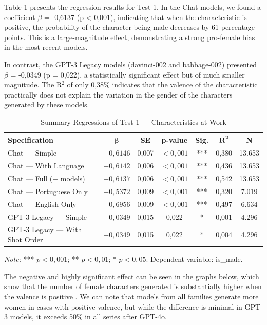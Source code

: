 \documentclass[jair,11pt,letterpaper]{article}
\begin{document}
Table 1 presents the regression results for Test 1. In the
Chat models, we found a coefficient $\beta$ = -0,6137 (p < 0,001),
indicating that when the characteristic is positive, the probability of the
character being male decreases by 61 percentage points. This is a
large-magnitude effect, demonstrating a strong pro-female bias in the
most recent models.

In contrast, the GPT-3 Legacy models (davinci-002 and babbage-002)
presented $\beta$ = -0,0349 (p = 0,022), a statistically
significant effect but of much smaller magnitude. The R$^2$ of only 0,38\%
indicates that the valence of the characteristic practically does not explain the
variation in the gender of the characters generated by these models.


\begin{table}[H]
\centering
\begin{tabular}{lcccccc}
\toprule
\textbf{Specification} & $\boldsymbol{\beta}$ & \textbf{SE} & \textbf{p-value} & \textbf{Sig.} & $\boldsymbol{R^2}$ & \textbf{N} \\
\midrule
Chat --- Simple & $-0,6146$ & 0,007 & $<0,001$ & *** & 0,380 & 13.653 \\
Chat --- With Language & $-0,6142$ & 0,006 & $<0,001$ & *** & 0,436 & 13.653 \\
Chat --- Full (+ models) & $-0,6137$ & 0,006 & $<0,001$ & *** & 0,542 & 13.653 \\
Chat --- Portuguese Only & $-0,5372$ & 0,009 & $<0,001$ & *** & 0,320 & 7.019 \\
Chat --- English Only & $-0,6956$ & 0,009 & $<0,001$ & *** & 0,497 & 6.634 \\
GPT-3 Legacy --- Simple & $-0,0349$ & 0,015 & 0,022 & * & 0,001 & 4.296 \\
GPT-3 Legacy --- With Shot Order & $-0,0349$ & 0,015 & 0,022 & * & 0,004 & 4.296 \\
\bottomrule
\end{tabular}

\smallskip
\footnotesize\textit{Note:} *** $p < 0,001$; ** $p < 0,01$; * $p < 0,05$. Dependent variable: is\_male.
\caption{Summary Regressions of Test 1 --- Characteristics at Work}
\label{tab:reg-teste1}
\end{table}


The negative and highly significant effect can be seen in the graphs
below, which show that the number of female characters generated is
substantially higher when the valence is positive . We can note that
models from all families generate more women in cases with positive valence,
but while the difference is minimal in GPT-3 models, it
exceeds 50\% in all series after GPT-4o.
\end{document}
